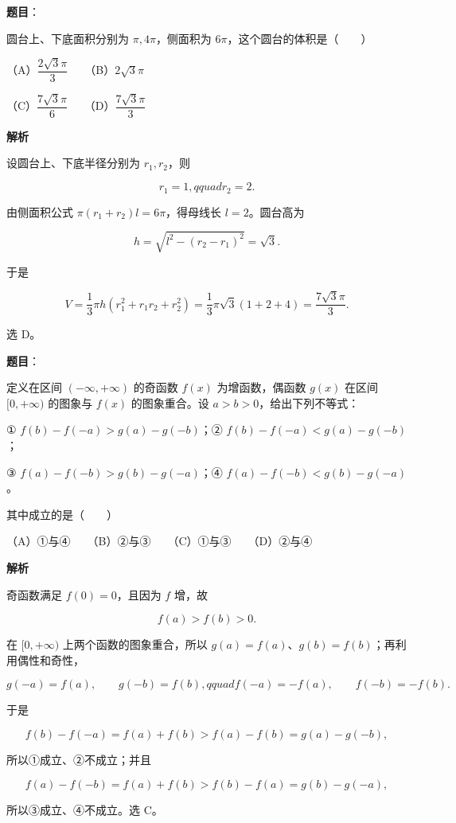 \begin{answer}

\textbf{题目}：

圆台上、下底面积分别为 $\pi,4\pi$，侧面积为 $6\pi$，这个圆台的体积是\mbox{（　　）}

（A）$\dfrac{2\sqrt3\pi}{3}$　　（B）$2\sqrt3\pi$

（C）$\dfrac{7\sqrt3\pi}{6}$　　（D）$\dfrac{7\sqrt3\pi}{3}$

\textbf{解析}

设圆台上、下底半径分别为 $r_1,r_2$，则

\nopagebreak[4]
\[
r_1=1,qquad r_2=2.
\]

由侧面积公式 $\pi(r_1+r_2)l=6\pi$，得母线长 $l=2$。圆台高为

\nopagebreak[4]
\[
h=\sqrt{l^2-(r_2-r_1)^2}=\sqrt3.
\]

于是

\nopagebreak[4]
\[
V=\frac13\pi h(r_1^2+r_1r_2+r_2^2)
=\frac13\pi\sqrt3(1+2+4)
=\frac{7\sqrt3\pi}{3}.
\]

选 D。


\end{answer}
\begin{answer}

\textbf{题目}：

定义在区间 $(-\infty,+\infty)$ 的奇函数 $f(x)$ 为增函数，偶函数 $g(x)$ 在区间 $[0,+\infty)$ 的图象与 $f(x)$ 的图象重合。设 $a>b>0$，给出下列不等式：

① $f(b)-f(-a)>g(a)-g(-b)$；② $f(b)-f(-a)<g(a)-g(-b)$；

③ $f(a)-f(-b)>g(b)-g(-a)$；④ $f(a)-f(-b)<g(b)-g(-a)$。

其中成立的是\mbox{（　　）}

（A）①与④　　（B）②与③　　（C）①与③　　（D）②与④

\textbf{解析}

奇函数满足 $f(0)=0$，且因为 $f$ 增，故

\nopagebreak[4]
\[
f(a)>f(b)>0.
\]

在 $[0,+\infty)$ 上两个函数的图象重合，所以 $g(a)=f(a)$、$g(b)=f(b)$；再利用偶性和奇性，

\nopagebreak[4]
\[
g(-a)=f(a),\qquad g(-b)=f(b),qquad f(-a)=-f(a),\qquad f(-b)=-f(b).
\]

于是

\nopagebreak[4]
\[
f(b)-f(-a)=f(a)+f(b)>f(a)-f(b)=g(a)-g(-b),
\]

所以①成立、②不成立；并且

\nopagebreak[4]
\[
f(a)-f(-b)=f(a)+f(b)>f(b)-f(a)=g(b)-g(-a),
\]

所以③成立、④不成立。选 C。


\end{answer}
